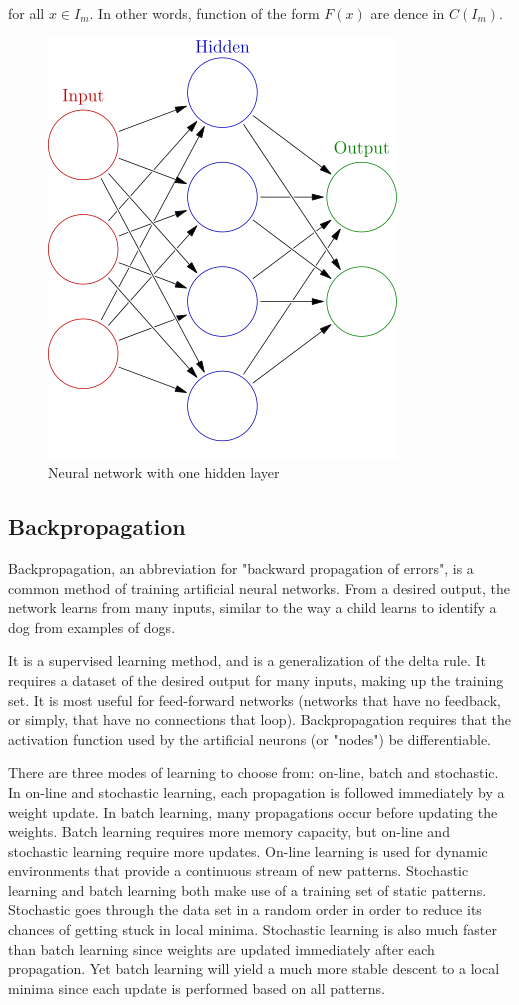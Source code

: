 \documentclass[a4paper,12pt]{article}
\begin{document}
for all $ x \in I_m$. In other words, function of the form $ F(x) $ are dence in $ C(I_m) $.   
\begin{figure}[ht]
 \centering
 \includegraphics[scale=0.4]{images/neurons.png}
 \caption{Neural network with one hidden layer}
\end{figure}

\subsection{Backpropagation}

Backpropagation, an abbreviation for "backward propagation of errors", is a common method of training artificial neural networks. From a desired output, the network learns from many inputs, similar to the way a child learns to identify a dog from examples of dogs.

It is a supervised learning method, and is a generalization of the delta rule. It requires a dataset of the desired output for many inputs, making up the training set. It is most useful for feed-forward networks (networks that have no feedback, or simply, that have no connections that loop). Backpropagation requires that the activation function used by the artificial neurons (or "nodes") be differentiable.

There are three modes of learning to choose from: on-line, batch and stochastic. In on-line and stochastic learning, each propagation is followed immediately by a weight update. In batch learning, many propagations occur before updating the weights. Batch learning requires more memory capacity, but on-line and stochastic learning require more updates. On-line learning is used for dynamic environments that provide a continuous stream of new patterns. Stochastic learning and batch learning both make use of a training set of static patterns. Stochastic goes through the data set in a random order in order to reduce its chances of getting stuck in local minima. Stochastic learning is also much faster than batch learning since weights are updated immediately after each propagation. Yet batch learning will yield a much more stable descent to a local minima since each update is performed based on all patterns.
\end{document}
